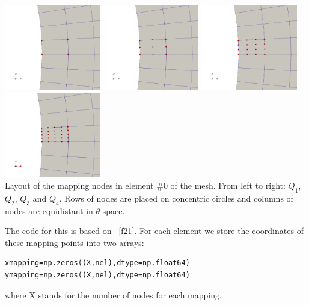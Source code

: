 \begin{center}
\includegraphics[width=4.2cm]{python_codes/fieldstone_152/images/mappingQ1}
\includegraphics[width=4.2cm]{python_codes/fieldstone_152/images/mappingQ2}
\includegraphics[width=4.2cm]{python_codes/fieldstone_152/images/mappingQ3}
\includegraphics[width=4.2cm]{python_codes/fieldstone_152/images/mappingQ4}\\
{\captionfont Layout of the mapping nodes in element \#0 of the mesh. 
From left to right: $Q_1$, $Q_2$, $Q_3$ and $Q_4$. Rows of nodes are placed 
on concentric circles and columns of nodes are equidistant in $\theta$ space.} 
\end{center}

The code for this \stone is based on \stone~\ref{f21}.  
For each element we store the coordinates of these mapping points into two 
arrays:
\begin{lstlisting}
xmapping=np.zeros((X,nel),dtype=np.float64)
ymapping=np.zeros((X,nel),dtype=np.float64)
\end{lstlisting}
where {\python X} stands for the number of nodes for each mapping.

